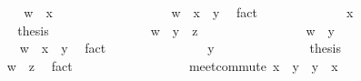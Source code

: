 \begin{isabellebody}
\ \ \ \ \isamarkupfalse%
\isanewline
\ \ \ \ \ \ \isamarkupfalse%
\ {\isachardoublequoteopen}w\ {\isasymsqsubseteq}\ x{\isachardoublequoteclose}\isanewline
\ \ \ \ \ \ \isamarkupfalse%
\ {\isacharminus}\isanewline
\ \ \ \ \ \ \ \ \isamarkupfalse%
\ {\isachardoublequoteopen}w\ {\isasymsqsubseteq}\ x\ {\isasymsqinter}\ y{\isachardoublequoteclose}\ \isamarkupfalse%
\ fact\isanewline
\ \ \ \ \ \ \ \ \isamarkupfalse%
\ \isamarkupfalse%
\ {\isachardoublequoteopen}{\isasymdots}\ {\isasymsqsubseteq}\ x{\isachardoublequoteclose}\ \isacommand{{\isachardot}{\isachardot}}\isamarkupfalse%
\isanewline
\ \ \ \ \ \ \ \ \isamarkupfalse%
\ \isamarkupfalse%
\ {\isacharquery}thesis\ \isacommand{{\isachardot}}\isamarkupfalse%
\isanewline
\ \ \ \ \ \ \isamarkupfalse%
\isanewline
\ \ \ \ \ \ \isamarkupfalse%
\ {\isachardoublequoteopen}w\ {\isasymsqsubseteq}\ y\ {\isasymsqinter}\ z{\isachardoublequoteclose}\isanewline
\ \ \ \ \ \ \isamarkupfalse%
\isanewline
\ \ \ \ \ \ \ \ \isamarkupfalse%
\ {\isachardoublequoteopen}w\ {\isasymsqsubseteq}\ y{\isachardoublequoteclose}\isanewline
\ \ \ \ \ \ \ \ \isamarkupfalse%
\ {\isacharminus}\isanewline
\ \ \ \ \ \ \ \ \ \ \isamarkupfalse%
\ {\isachardoublequoteopen}w\ {\isasymsqsubseteq}\ x\ {\isasymsqinter}\ y{\isachardoublequoteclose}\ \isamarkupfalse%
\ fact\isanewline
\ \ \ \ \ \ \ \ \ \ \isamarkupfalse%
\ \isamarkupfalse%
\ {\isachardoublequoteopen}{\isasymdots}\ {\isasymsqsubseteq}\ y{\isachardoublequoteclose}\ \isacommand{{\isachardot}{\isachardot}}\isamarkupfalse%
\isanewline
\ \ \ \ \ \ \ \ \ \ \isamarkupfalse%
\ \isamarkupfalse%
\ {\isacharquery}thesis\ \isacommand{{\isachardot}}\isamarkupfalse%
\isanewline
\ \ \ \ \ \ \ \ \isamarkupfalse%
\isanewline
\ \ \ \ \ \ \ \ \isamarkupfalse%
\ {\isachardoublequoteopen}w\ {\isasymsqsubseteq}\ z{\isachardoublequoteclose}\ \isamarkupfalse%
\ fact\isanewline
\ \ \ \ \ \ \isamarkupfalse%
\isanewline
\ \ \ \ \isamarkupfalse%
\isanewline
\ \ \isamarkupfalse%
\isanewline
\isanewline
\ \ \isamarkupfalse%
\ meet{\isacharunderscore}commute{\isacharcolon}\ {\isachardoublequoteopen}x\ {\isasymsqinter}\ y\ {\isacharequal}\ y\ {\isasymsqinter}\ x{\isachardoublequoteclose}\isanewline

\end{isabellebody}

